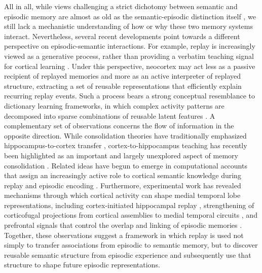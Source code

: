 \documentclass{article}
\begin{document}
All in all, while views challenging a strict dichotomy between semantic and episodic memory are almost as old as the semantic-episodic distinction itself , we still lack a mechanistic understanding of how or why these two memory systems interact. Nevertheless, several recent developments point towards a different perspective on episodic-semantic interactions. For example, replay is increasingly viewed as a generative process, rather than providing a verbatim teaching signal for cortical learning . Under this perspective, neocortex may act less as a passive recipient of replayed memories and more as an active interpreter of replayed structure, extracting a set of reusable representations that efficiently explain recurring replay events. Such a process bears a strong conceptual resemblance to dictionary learning frameworks, in which complex activity patterns are decomposed into sparse combinations of reusable latent features . A complementary set of observations concerns the flow of information in the opposite direction. While consolidation theories have traditionally emphasized hippocampus-to-cortex transfer , cortex-to-hippocampus teaching has recently been highlighted as an important and largely unexplored aspect of memory consolidation . Related ideas have begun to emerge in computational accounts that assign an increasingly active role to cortical semantic knowledge during replay  and episodic encoding . Furthermore, experimental work has revealed mechanisms through which cortical activity can shape medial temporal lobe representations, including cortex-initiated hippocampal replay , strengthening of corticofugal projections from cortical assemblies to medial temporal circuits , and prefrontal signals that control the overlap and linking of episodic memories .  Together, these observations suggest a framework in which replay is used not simply to transfer associations from episodic to semantic memory, but to discover reusable semantic structure from episodic experience and subsequently use that structure to shape future episodic representations.
\newline\newline
\end{document}
